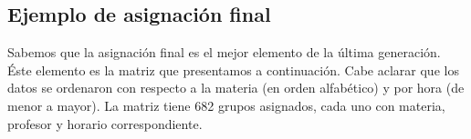 \begin{appendices}
\chapter{ }







\section{Ejemplo de asignación final} \label{Ej_AsigFinal}

Sabemos que la asignación final es el mejor elemento de la última generación. Éste elemento es la matriz que presentamos a continuación. Cabe aclarar que los datos se ordenaron con respecto a la materia (en orden alfabético) y por hora (de menor a mayor). La matriz tiene 682 grupos asignados, cada uno con materia, profesor y horario correspondiente.

\dfNmatAsigFinal

%
\end{appendices}
